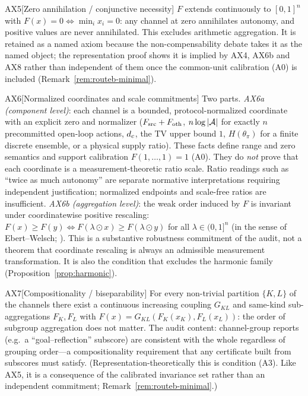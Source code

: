 \begin{axiom}{AX5}[Zero annihilation / conjunctive necessity]\label{ax:5}
$F$ extends continuously to $[0,1]^n$ with $F(x)=0\iff\min_i x_i=0$: any
channel at zero annihilates autonomy, and positive values are never
annihilated. This excludes arithmetic aggregation. It is retained as a named
axiom because the non-compensability debate takes it as the named object;
the representation proof shows it is implied by AX4, AX6b and AX8 rather
than independent of them once the common-unit calibration (A0) is included
(Remark~\ref{rem:routeb-minimal}).
\end{axiom}

\begin{axiom}{AX6}[Normalized coordinates and scale commitments]
\label{ax:6}
Two parts. \emph{AX6a (component level)}: each channel is a bounded,
protocol-normalized coordinate with an explicit zero and normalizer
($F_{\mathrm{src}}+F_{\mathrm{oth}}$, $n\log|\mathcal{A}|$ for exactly $n$ precommitted open-loop actions, $d_{c}$, the TV upper bound $1$,
$H(\theta_\pi)$ for a finite discrete ensemble, or a physical supply ratio).
These facts define range and zero semantics and support calibration
$F(1,\ldots,1)=1$ (A0). They do \emph{not} prove that each coordinate is a
measurement-theoretic ratio scale. Ratio readings such as ``twice as much
autonomy'' are separate normative interpretations requiring independent
justification; normalized endpoints and scale-free ratios are insufficient.
\emph{AX6b (aggregation level)}: the weak order induced by $F$ is invariant
under coordinatewise positive rescaling:
$F(x)\ge F(y)\iff F(\lambda\odot x)\ge F(\lambda\odot y)$ for all
$\lambda\in(0,1]^n$ (in the sense of Ebert--Welsch; \citealp{oecd2008}).
This is a substantive robustness commitment of the audit, not a theorem that
coordinate rescaling is always an admissible measurement transformation. It is
also the condition that excludes the harmonic family
(Proposition~\ref{prop:harmonic}).
\end{axiom}

\begin{axiom}{AX7}[Compositionality / biseparability]\label{ax:7}
For every non-trivial partition $\{K,L\}$ of the channels there exist a
continuous increasing coupling $G_{KL}$ and same-kind sub-aggregations
$F_K,F_L$ with $F(x)=G_{KL}(F_K(x_K),F_L(x_L))$: the order of subgroup
aggregation does not matter. The audit content: channel-group reports (e.g.\
a ``goal--reflection'' subscore) are consistent with the whole regardless of
grouping order---a compositionality requirement that any certificate built
from subscores must satisfy. (Representation-theoretically this is condition
(A3). Like AX5, it is a consequence of the calibrated invariance set rather
than an independent commitment; Remark~\ref{rem:routeb-minimal}.)
\end{axiom}

